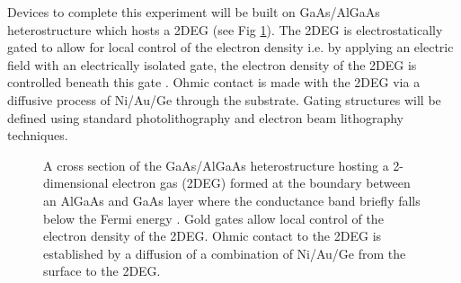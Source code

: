 Devices to complete this experiment will be built on GaAs/AlGaAs heterostructure which hosts a 2DEG (see Fig \ref{fig:algaas}). The 2DEG is electrostatically gated to allow for local control of the electron density i.e. by applying an electric field with an electrically isolated gate, the electron density of the 2DEG is controlled beneath this gate \cite{Kouwenhoven1997}. Ohmic contact is made with the 2DEG via a diffusive process of Ni/Au/Ge through the substrate. Gating structures will be defined using standard photolithography and electron beam lithography techniques.  

\begin{figure}[h]
\centering
{}
\caption{ A cross section of the GaAs/AlGaAs heterostructure hosting a 2-dimensional electron gas (2DEG) formed at the boundary between an AlGaAs and GaAs layer where the conductance band briefly falls below the Fermi energy \cite{Baer}. Gold gates allow local control of the electron density of the 2DEG. Ohmic contact to the 2DEG is established by a diffusion of a combination of Ni/Au/Ge from the surface to the 2DEG.}

\label{fig:algaas}       %
\end{figure}

\endinput

Any text after an \endinput is ignored.
You could put scraps here or things in progress.
